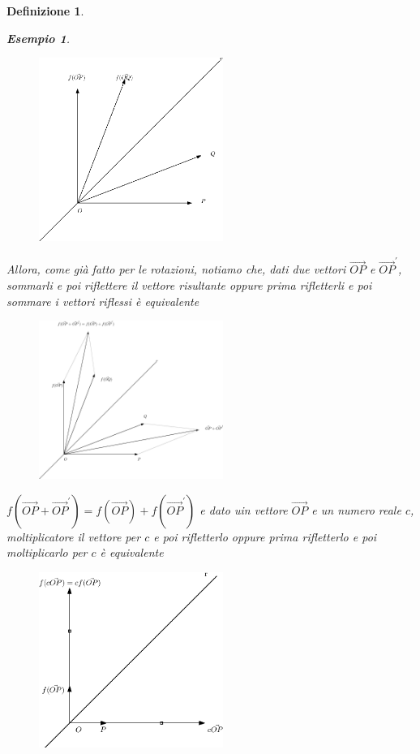 \message{ !name(algebraegeometria.tex)}\documentclass{book}
\newtheorem{definizione}{Definizione}
\newtheorem{esempio}{Esempio}
\begin{document}
\begin{definizione}
\begin{esempio}
    \begin{figure}[th]
      \centering
        \includegraphics[width=6cm]{img/finiti/imgex4-2-4.eps}
    \end{figure}   
    Allora, come già fatto per le rotazioni, notiamo che, dati due vettori $\vec{OP}$ e $\vec{OP}^\prime$,
    sommarli e poi riflettere il vettore risultante oppure prima rifletterli e poi sommare i vettori riflessi
    è equivalente
    \clearpage
    \begin{figure}[th]
      \centering
        \includegraphics[width=6cm]{img/finiti/imgex4-2-5.eps}
    \end{figure}
    $f\left(\vec{OP}+\vec{OP}^\prime\right)=f\left(\vec{OP}\right)+f\left(\vec{OP}^\prime\right)$ e
    dato uin vettore $\vec{OP}$ e un numero
    reale $c$, moltiplicatore il vettore per $c$ e poi rifletterlo oppure prima rifletterlo e poi moltiplicarlo
    per $c$ è equivalente
    \begin{figure}[th]
      \centering
        \includegraphics[width=6cm]{img/finiti/imgex4-2-6.eps}
    \end{figure}
      

\end{esempio}
\end{definizione}
\end{document}
